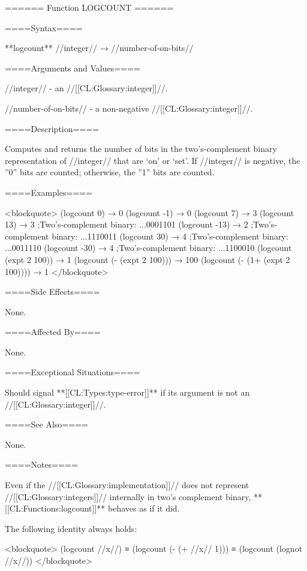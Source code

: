 ====== Function LOGCOUNT ======

====Syntax====

**logcount** //integer// → //number-of-on-bits//

====Arguments and Values====

//integer// - an //[[CL:Glossary:integer]]//.

//number-of-on-bits// - a non-negative //[[CL:Glossary:integer]]//.

====Description====

Computes and returns the number of bits in the two's-complement binary representation of //integer// that are `on' or `set'. If //integer// is negative, the ''0'' bits are counted; otherwise, the ''1'' bits are counted.

====Examples====

<blockquote> (logcount 0) → 0 (logcount -1) → 0 (logcount 7) → 3 (logcount 13) → 3 ;Two's-complement binary: ...0001101 (logcount -13) → 2 ;Two's-complement binary: ...1110011 (logcount 30) → 4 ;Two's-complement binary: ...0011110 (logcount -30) → 4 ;Two's-complement binary: ...1100010 (logcount (expt 2 100)) → 1 (logcount (- (expt 2 100))) → 100 (logcount (- (1+ (expt 2 100)))) → 1 </blockquote>

====Side Effects====

None.

====Affected By====

None.

====Exceptional Situations====

Should signal **[[CL:Types:type-error]]** if its argument is not an //[[CL:Glossary:integer]]//.

====See Also====

None.

====Notes====

Even if the //[[CL:Glossary:implementation]]// does not represent //[[CL:Glossary:integers]]// internally in two's complement binary, **[[CL:Functions:logcount]]** behaves as if it did.

The following identity always holds:

<blockquote> (logcount //x//) ≡ (logcount (- (+ //x// 1))) ≡ (logcount (lognot //x//)) </blockquote>

